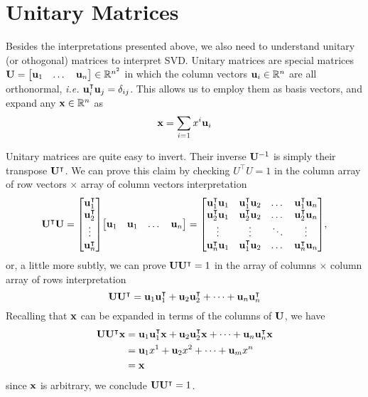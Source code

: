 \documentclass{article}
\begin{document}
\section{Unitary Matrices}
Besides the interpretations presented above, we also need to understand unitary (or othogonal) matrices to interpret SVD. Unitary matrices are special matrices $\vb{U}=\mqty[\vb{u}_1 & \dots & \vb{u}_n]\in\mathbb{R}^{n^2}$ in which the column vectors $\vb{u}_i\in\mathbb{R}^n$ are all orthonormal, \textit{i.e.} $\vb{u}_i^\intercal \vb{u}_j = \delta_{ij}$. This allows us to employ them as basis vectors, and expand any $\vb{x}\in\mathbb{R}^n$ as $$\vb{x}= \sum_{i=1} x^i \vb{u}_i$$ 

Unitary matrices are quite easy to invert. Their inverse $\vb{U}^{-1}$ is simply their transpose $\vb{U}^{\intercal}$. We can prove this claim by checking $U^\intercal U = 1$ in the column array of row vectors $\times$ array of column vectors interpretation
\begin{equation}
    \vb{U}^{\intercal}\vb{U} = \mqty[\vb{u}_1^\intercal \\ \vb{u}_2^\intercal \\ \vdots \\\vb{u}_n^\intercal]\mqty[\vb{u}_1 & \vb{u}_1 & \dots & \vb{u}_n] =     
        \mqty[\vb{u}_1^\intercal\vb{u}_1 & \vb{u}_1^\intercal\vb{u}_2 & \dots & \vb{u}_1^\intercal\vb{u}_n\\
        \vb{u}_2^\intercal\vb{u}_1 & \vb{u}_2^\intercal\vb{u}_2 & \dots & \vb{u}_2^\intercal\vb{u}_n\\
        \vdots & \vdots & \ddots & \vdots\\
        \vb{u}_n^\intercal\vb{u}_1 & \vb{u}_1^\intercal\vb{u}_2 & \dots & \vb{u}_n^\intercal\vb{u}_n],
\end{equation}
or, a little more subtly, we can prove $\vb{U}\vb{U}^\intercal=1$ in the array of columns $\times$ column array of rows interpretation
\begin{equation}
    \vb{U}\vb{U}^\intercal = \vb{u}_1\vb{u}_1^\intercal + \vb{u}_2\vb{u}_2^\intercal + \dots + \vb{u}_n\vb{u}_n^\intercal
\end{equation}
Recalling that $\vb{x}$ can be expanded in terms of the columns of $\vb{U}$, we have
\begin{equation}
    \begin{aligned}
    \vb{U}\vb{U}^\intercal \vb{x} &= \vb{u}_1\vb{u}_1^\intercal\vb{x} + \vb{u}_2\vb{u}_2^\intercal\vb{x} + \dots + \vb{u}_n\vb{u}_n^\intercal\vb{x}\\
       & = \vb{u}_1 x^1 + \vb{u}_2 x^2 + \dots + \vb{u}_m x^n\\
       & = \vb{x}
    \end{aligned}
 \end{equation}
 since $\vb{x}$ is arbitrary, we conclude $\vb{U}\vb{U}^\intercal=1$. 
\end{document}
